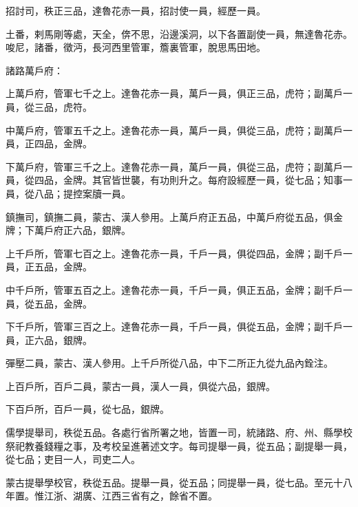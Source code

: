 \begin{pinyinscope}
 招討司，秩正三品，達魯花赤一員，招討使一員，經歷一員。



 土番，剌馬剛等處，天全，倴不思，沿邊溪洞，以下各置副使一員，無達魯花赤。唆尼，諸番，徵沔，長河西里管軍，簷裏管軍，脫思馬田地。



 諸路萬戶府：



 上萬戶府，管軍七千之上。達魯花赤一員，萬戶一員，俱正三品，虎符；副萬戶一員，從三品，虎符。



 中萬戶府，管軍五千之上。達魯花赤一員，萬戶一員，俱從三品，虎符；副萬戶一員，正四品，金牌。



 下萬戶府，管軍三千之上。達魯花赤一員，萬戶一員，俱從三品，虎符；副萬戶一員，從四品，金牌。其官皆世襲，有功則升之。每府設經歷一員，從七品；知事一員，從八品；提控案牘一員。



 鎮撫司，鎮撫二員，蒙古、漢人參用。上萬戶府正五品，中萬戶府從五品，俱金牌；下萬戶府正六品，銀牌。



 上千戶所，管軍七百之上。達魯花赤一員，千戶一員，俱從四品，金牌；副千戶一員，正五品，金牌。



 中千戶所，管軍五百之上。達魯花赤一員，千戶一員，俱正五品，金牌；副千戶一員，從五品，金牌。



 下千戶所，管軍三百之上。達魯花赤一員，千戶一員，俱從五品，金牌；副千戶一員，正六品，銀牌。



 彈壓二員，蒙古、漢人參用。上千戶所從八品，中下二所正九從九品內銓注。



 上百戶所，百戶二員，蒙古一員，漢人一員，俱從六品，銀牌。



 下百戶所，百戶一員，從七品，銀牌。



 儒學提舉司，秩從五品。各處行省所署之地，皆置一司，統諸路、府、州、縣學校祭祀教養錢糧之事，及考校呈進著述文字。每司提舉一員，從五品；副提舉一員，從七品；吏目一人，司吏二人。



 蒙古提舉學校官，秩從五品。提舉一員，從五品；同提舉一員，從七品。至元十八年置。惟江浙、湖廣、江西三省有之，餘省不置。




\end{pinyinscope}
